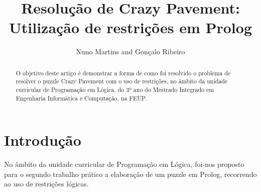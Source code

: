 \documentclass[runningheads,a4paper,12pt]{llncs}
\begin{document}
\mainmatter  %

\title{Resolução de Crazy Pavement:\\Utilização de restrições em Prolog}


%
%
\author{Nuno Martins and Gonçalo Ribeiro}

%
%

\maketitle


\begin{abstract}
O objetivo deste artigo é demonstrar a forma de como foi resolvido o problema de resolver o puzzle Crazy Pavement com o uso de restrições, no âmbito da unidade curricular de Programação em Lógica, do 3º ano do Mestrado Integrado em Engenharia Informática e Computação, na FEUP.
\end{abstract}

\section{Introdução}

No âmbito da unidade curricular de Programação em Lógica, foi-nos proposto para o segundo trabalho prático a elaboração de um puzzle em Prolog, recorrendo ao uso de restrições lógicas.
\end{document}

